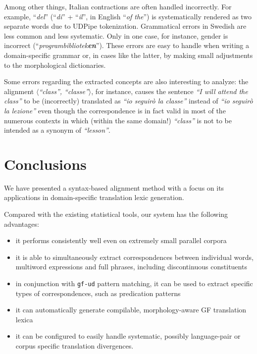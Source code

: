 \documentclass[11pt]{article}
\begin{document}
Among other things, Italian contractions are often handled incorrectly.
For example, ``\textit{del}'' (``\textit{di}'' + ``\textit{il}'', in English ``\textit{of the}'') is systematically rendered as two separate words due to UDPipe tokenization.
Grammatical errors in Swedish are less common and less systematic. 
Only in one case, for instance, gender is incorrect (``\textit{programbibliotek\textbf{en}}''). 
These errors are easy to handle when writing a domain-specific grammar or, in cases like the latter, by making small adjustments to the morphological dictionaries. 

Some errors regarding the extracted concepts are also interesting to analyze: the alignment $\langle$\textit{``class'', ``classe''}$\rangle$, for instance, causes the sentence \textit{``I will attend the class''} to be (incorrectly) translated as \textit{``io seguirò la classe''} instead of \textit{``io seguirò la lezione''} even though the correspondence is in fact valid in most of the numerous contexts in which (within the same domain!) \textit{``class''} is not to be intended as a synonym of \textit{``lesson''}.

\section{Conclusions} \label{conclusions}
We have presented a syntax-based alignment method with a focus on its applications in domain-specific translation lexic generation.

Compared with the existing statistical tools, our system has the following advantages:
\begin{itemize} \setlength\itemsep{0.1em}
  \item it performs consistently well even on extremely small parallel corpora
  \item it is able to simultaneously extract correspondences between individual words, multiword expressions and full phrases, including discontinuous constituents
  \item in conjunction with \texttt{gf-ud} pattern matching, it can be used to extract specific types of correspondences, such as predication patterns  
  \item it can automatically generate compilable, morphology-aware GF translation lexica
  \item it can be configured to easily handle systematic, possibly language-pair or corpus specific translation divergences.
\end{itemize}
\end{document}
